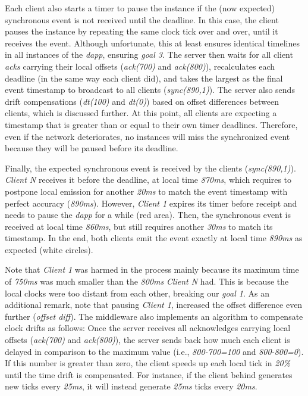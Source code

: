 \documentclass[sigplan,screen]{acmart}
\newcommand{\dapp}{\emph{dapp}\xspace}
\begin{document}
Each client also starts a timer to pause the instance if the (now expected)
synchronous event is not received until the deadline.
In this case, the client pauses the instance by repeating the same clock tick
over and over, until it receives the event.
Although unfortunate, this at least ensures identical timelines in all
instances of the \dapp, ensuring \emph{goal 3}.
%
The server then waits for all client \emph{acks} carrying their local offsets
(\emph{ack(700)} and \emph{ack(800)}), recalculates each deadline (in the same
way each client did), and takes the largest as the final event timestamp to
broadcast to all clients (\emph{sync(890,1)}).
The server also sends drift compensations (\emph{dt(100)} and \emph{dt(0)})
based on offset differences between clients, which is discussed further.
At this point, all clients are expecting a timestamp that is greater than or
equal to their own timer deadlines.
Therefore, even if the network deteriorates, no instances will miss the
synchronized event because they will be paused before its deadline.

Finally, the expected synchronous event is received by the clients
(\emph{sync(890,1)}).
\emph{Client N} receives it before the deadline, at local time \emph{870ms},
which requires to postpone local emission for another \emph{20ms} to match the
event timestamp with perfect accuracy (\emph{890ms}).
However, \emph{Client 1} expires its timer before receipt and needs to pause
the \dapp for a while (red area).
Then, the synchronous event is received at local time \emph{860ms}, but still
requires another \emph{30ms} to match its timestamp.
In the end, both clients emit the event exactly at local time \emph{890ms} as
expected (white circles).

Note that \emph{Client 1} was harmed in the process mainly because its maximum
time of \emph{750ms} was much smaller than the \emph{800ms} \emph{Client N}
had.
This is because the local clocks were too distant from each other, breaking our
\emph{goal 1}.
As an additional remark, note that pausing \emph{Client 1}, increased the
offset difference even further (\emph{offset diff}).
%
The middleware also implements an algorithm to compensate clock drifts as
follows:
Once the server receives all acknowledges carrying local offsets
(\emph{ack(700)} and \emph{ack(800)}), the server sends back how much each
client is delayed in comparison to the maximum value (i.e., \emph{800-700=100}
and \emph{800-800=0}).
If this number is greater than zero, the client speeds up each local tick in
\emph{20\%} until the time drift is compensated.
For instance, if the client behind generates new ticks every \emph{25ms}, it
will instead generate \emph{25ms} ticks every \emph{20ms}.
\end{document}
